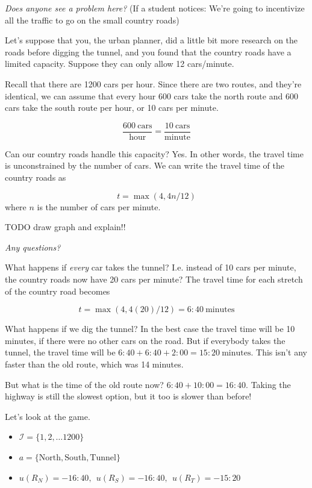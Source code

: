 \documentclass[11pt]{article}
\begin{document}
{\it Does anyone see a problem here?} (If a student notices: We're going to incentivize all the traffic to go on the small country roads)

Let's suppose that you, the urban planner, did a little bit more research on the roads before digging the tunnel, and you found that the country roads have a limited capacity. Suppose they can only allow 12 cars/minute. 

Recall that there are 1200 cars per hour. Since there are two routes, and they're identical, we can assume that every hour 600 cars take the north route and 600 cars take the south route per hour, or 10 cars per minute. 

$$ \frac{600~\text{cars}}{\text{hour}} = \frac{10~\text{cars}}{\text{minute}}$$

Can our country roads handle this capacity? Yes. 
In other words, the travel time is unconstrained by the number of cars.
We can write the travel time of the country roads as

$$ t = \max(4, 4n/12)$$
where $n$ is the number of cars per minute.

TODO draw graph and explain!!

{\it Any questions?}

What happens if {\it every} car takes the tunnel? I.e. instead of 10 cars per minute, the country roads now have 20 cars per minute? The travel time for each stretch of the country road becomes

$$ t = \max(4, 4(20)/12) = 6{:}40~\text{minutes}$$ 

What happens if we dig the tunnel? In the best case the travel time will be 10 minutes, if there were no other cars on the road. But if everybody takes the tunnel, the travel time will be $6{:}40 + 6{:}40  + 2{:}00 = 15{:}20~\text{minutes}$. This isn't any faster than the old route, which was 14 minutes.

But what is the time of the old route now? $6{:}40 + 10{:}00 = 16{:}40$. Taking the highway is still the slowest option, but it too is slower than before!

Let's look at the game.

\begin{itemize}
    \item $\mathcal{I} = \{1,2,\ldots 1200\}$
    \item $a = \{\text{North},\text{South},\text{Tunnel}\}$
    \item $u(R_N) = -16{:}40,~~u(R_S) = -16{:}40,~~u(R_T) = -15{:}20$
\end{itemize}
\end{document}
